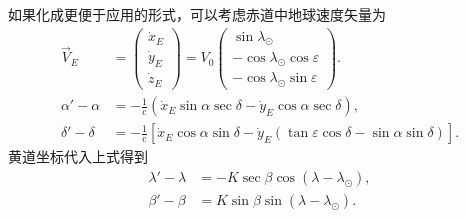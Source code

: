 \documentclass[11pt, a4paper, oneside]{ctexart}
\numberwithin{equation}{subsection}
\begin{document}
如果化成更便于应用的形式，可以考虑赤道中地球速度矢量为
\begin{align}
\vec V_E&=\begin{pmatrix}
\dot x_E\\
\dot y_E\\
\dot z_E
\end{pmatrix}=V_0\begin{pmatrix}
\sin\lambda_\odot\\
-\cos\lambda_\odot\cos\varepsilon\\
-\cos\lambda_\odot\sin\varepsilon
\end{pmatrix}.\\
\alpha'-\alpha&=-\frac{1}{\mathrm{c}}\left(\dot x_E\sin\alpha\sec\delta-\dot y_E\cos\alpha\sec\delta\right),\\
\delta'-\delta&=-\frac{1}{\mathrm{c}}\left[\dot x_E\cos\alpha\sin\delta-\dot y_E\left(\tan\varepsilon\cos\delta-\sin\alpha\sin\delta\right)\right].
\end{align}
黄道坐标代入上式得到
\begin{align}
\lambda'-\lambda&=-K\sec\beta\cos\left(\lambda-\lambda_\odot\right),\\
\beta'-\beta&=K\sin\beta\sin\left(\lambda-\lambda_\odot\right).
\end{align}
\end{document}
